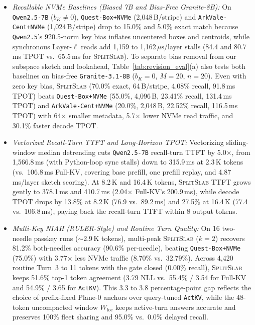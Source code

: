 \documentclass[pdflatex,sn-mathphys-num]{sn-jnl}
\theoremstyle{thmstyleone}
\newcommand{\SplitSlab}{\textsc{SplitSlab}}
\begin{document}
\begin{itemize}
  \item \emph{Recallable NVMe Baselines (Biased 7B and Bias-Free Granite-8B):} On \texttt{Qwen2.5-7B} ($b_K \neq 0$), \texttt{Quest-Box+NVMe} (2,048\,B/stripe) and \texttt{ArkVale-Cent+NVMe} (1,024\,B/stripe) drop to 15.0\% and 5.0\% exact match because \texttt{Qwen2.5}'s 920.5-norm key bias inflates uncentered boxes and centroids, while synchronous Layer-$\ell$ reads add 1,159 to 1,162\,$\mu\mathrm{s}$/layer stalls (84.4 and 80.7\,ms TPOT vs.\ 65.5\,ms for \SplitSlab{}). To separate bias removal from our subspace sketch and lookahead, Table~\ref{tab:revision_eval}(a) also tests both baselines on bias-free \texttt{Granite-3.1-8B} ($b_K = 0$, $M = 20$, $n = 20$). Even with zero key bias, \SplitSlab{} (70.0\% exact, 64\,B/stripe, 4.08\% recall, 91.8\,ms TPOT) beats \texttt{Quest-Box+NVMe} (55.0\%, 4,096\,B, 23.41\% recall, 131.4\,ms TPOT) and \texttt{ArkVale-Cent+NVMe} (20.0\%, 2,048\,B, 22.52\% recall, 116.5\,ms TPOT) with 64$\times$ smaller metadata, 5.7$\times$ lower NVMe read traffic, and 30.1\% faster decode TPOT.

  \item \emph{Vectorized Recall-Turn TTFT and Long-Horizon TPOT:} Vectorizing sliding-window median detrending cuts \texttt{Qwen2.5-7B} recall-turn TTFT by 5.0$\times$, from 1,566.8\,ms (with Python-loop sync stalls) down to 315.9\,ms at 2.3\,K tokens (vs.\ 106.8\,ms Full-KV, covering base prefill, one prefill replay, and 4.87\,ms/layer sketch scoring). At 8.2\,K and 16.4\,K tokens, \SplitSlab{} TTFT grows gently to 378.1\,ms and 410.7\,ms (2.04$\times$ Full-KV's 200.9\,ms), while decode TPOT drops by 13.8\% at 8.2\,K (76.9 vs.\ 89.2\,ms) and 27.5\% at 16.4\,K (77.4 vs.\ 106.8\,ms), paying back the recall-turn TTFT within 8 output tokens.

  \item \emph{Multi-Key NIAH (RULER-Style) and Routine Turn Quality:} On 16 two-needle passkey runs ($\sim$2.9\,K tokens), multi-peak \SplitSlab{} ($k=2$) recovers 81.2\% both-needles accuracy (90.6\% per-needle), beating \texttt{Quest-Box+NVMe} (75.0\%) with 3.77$\times$ less NVMe traffic (8.70\% vs.\ 32.79\%). Across 4,420 routine Turn~3 to 11 tokens with the gate closed (0.00\% recall), \SplitSlab{} keeps 51.6\% top-1 token agreement (3.79 NLL vs.\ 55.4\% / 3.54 for Full-KV and 54.9\% / 3.65 for \texttt{ActKV}). This 3.3 to 3.8 percentage-point gap reflects the choice of prefix-fixed Plane-0 anchors over query-tuned \texttt{ActKV}, while the 48-token uncompacted window $W_{\mathrm{loc}}$ keeps active-turn answers accurate and preserves 100\% fleet sharing and 95.0\% vs.\ 0.0\% delayed recall.


\end{itemize}
\end{document}
